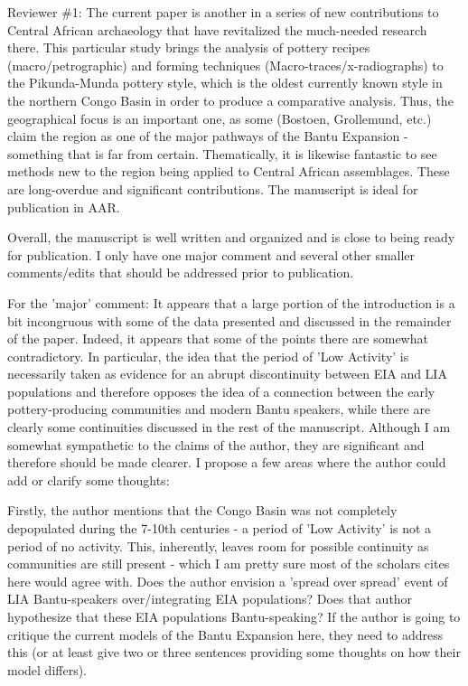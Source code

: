 \begin{reviewer}
Reviewer \#1: The current paper is another in a series of new contributions to Central African archaeology that have revitalized the much-needed research there. This particular study brings the analysis of pottery recipes (macro/petrographic) and forming techniques (Macro-traces/x-radiographs) to the Pikunda-Munda pottery style, which is the oldest currently known style in the northern Congo Basin in order to produce a comparative analysis. Thus, the geographical focus is an important one, as some (Bostoen, Grollemund, etc.) claim the region as one of the major pathways of the Bantu Expansion - something that is far from certain. Thematically, it is likewise fantastic to see methods new to the region being applied to Central African assemblages. These are long-overdue and significant contributions. The manuscript is ideal for publication in AAR.

Overall, the manuscript is well written and organized and is close to being ready for publication. I only have one major comment and several other smaller comments/edits that should be addressed prior to publication.

For the 'major' comment: It appears that a large portion of the introduction is a bit incongruous with some of the data presented and discussed in the remainder of the paper. Indeed, it appears that some of the points there are somewhat contradictory. In particular, the idea that the period of 'Low Activity' is necessarily taken as evidence for an abrupt discontinuity between EIA and LIA populations and therefore opposes the idea of a connection between the early pottery-producing communities and modern Bantu speakers, while there are clearly some continuities discussed in the rest of the manuscript. Although I am somewhat sympathetic to the claims of the author, they are significant and therefore should be made clearer. I propose a few areas where the author could add or clarify some thoughts:

\point Firstly, the author mentions that the Congo Basin was not completely depopulated during the 7-10th centuries - a period of 'Low Activity' is not a period of no activity. This, inherently, leaves room for possible continuity as communities are still present - which I am pretty sure most of the scholars cites here would agree with. Does the author envision a 'spread over spread' event of LIA Bantu-speakers over/integrating EIA populations? Does that author hypothesize that these EIA populations Bantu-speaking? If the author is going to critique the current models of the Bantu Expansion here, they need to address this (or at least give two or three sentences providing some thoughts on how their model differs).


\end{reviewer}
